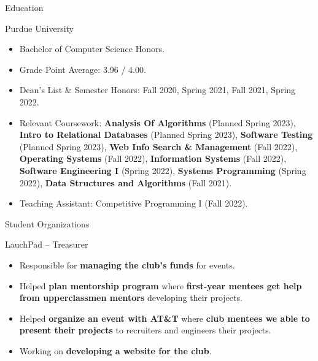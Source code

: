 \documentclass{article}
\newlength{\tabin}
\newlength{\secsep}
\newcommand{\lineunder}{\vspace*{-8pt} \\ \hspace*{-6pt} \hrulefill \\ \vspace*{-15pt}}
\newenvironment{tabbedsection}[1]{
  \begin{list}{}{
      \setlength{\itemsep}{0pt}
      \setlength{\labelsep}{0pt}
      \setlength{\labelwidth}{0pt}
      \setlength{\leftmargin}{\tabin}
      \setlength{\rightmargin}{\tabin}
      \setlength{\listparindent}{0pt}
      \setlength{\parsep}{0pt}
      \setlength{\parskip}{0pt}
      \setlength{\partopsep}{0pt}
      \setlength{\topsep}{#1}
    }
  \item[]
}{\end{list}}
\newenvironment{resume_section}[1]{
  \filbreak
  \vspace{2\secsep}
  \textsc{\large#1}
  \lineunder
  \begin{tabbedsection}{\secsep}
}{\end{tabbedsection}}
\newenvironment{resume_subsection}[2][]{
  \textbf{#2} \hfill {\footnotesize #1} \hspace{2em}
  \begin{tabbedsection}{0.5\secsep}
}{\end{tabbedsection}}
\newenvironment{subitems}{
  \renewcommand{\labelitemi}{-}
  \begin{itemize}
      \setlength{\labelsep}{1em}
}{\end{itemize}}
\begin{document}
\begin{resume_section}{Education}
  
  \begin{resume_subsection}{Purdue University}
    
    \begin{subitems}
      \item Bachelor of Computer Science Honors.
      \item Grade Point Average: 3.96 / 4.00.  	
  	  \item Dean's List \& Semester Honors: Fall 2020, Spring 2021, Fall 2021, Spring 2022.
  	  \item Relevant Coursework: \textbf{Analysis Of Algorithms} (Planned Spring 2023), \textbf{Intro to Relational Databases} (Planned Spring 2023), \textbf{Software Testing} (Planned Spring 2023), \textbf{Web Info Search \& Management} (Fall 2022), \textbf{Operating Systems} (Fall 2022), \textbf{Information Systems} (Fall 2022), \textbf{Software Engineering I} (Spring 2022), \textbf{Systems Programming} (Spring 2022), \textbf{Data Structures and Algorithms} (Fall 2021).
  	  \item Teaching Assistant: Competitive Programming I (Fall 2022).
	\end{subitems}  	
  	
  \end{resume_subsection}
  
\end{resume_section}

\begin{resume_section}{Student Organizations}

	\begin{resume_subsection}{LauchPad -- Treasurer}
    \begin{subitems}
		\item Responsible for \textbf{managing the club's funds} for events.
		\item Helped \textbf{plan mentorship program} where \textbf{first-year mentees get help from upperclassmen mentors} developing their projects.
		\item Helped \textbf{organize an event with AT\&T} where \textbf{club mentees we able to present their projects} to recruiters and engineers their projects.
		\item Working on \textbf{developing a website for the club}.
	\end{subitems}  
	\end{resume_subsection}
	
	
\end{resume_section}
\end{document}
